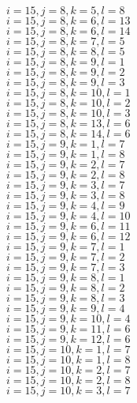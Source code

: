 \documentclass[14pt]{article}
\begin{document}
    $i=15,j=8,k=5,l=8 $ \\ 
    $i=15,j=8,k=6,l=13 $ \\ 
    $i=15,j=8,k=6,l=14 $ \\ 
    $i=15,j=8,k=7,l=5 $ \\ 
    $i=15,j=8,k=8,l=5 $ \\ 
    $i=15,j=8,k=9,l=1 $ \\ 
    $i=15,j=8,k=9,l=2 $ \\ 
    $i=15,j=8,k=9,l=3 $ \\ 
    $i=15,j=8,k=10,l=1 $ \\ 
    $i=15,j=8,k=10,l=2 $ \\ 
    $i=15,j=8,k=10,l=3 $ \\ 
    $i=15,j=8,k=13,l=6 $ \\ 
    $i=15,j=8,k=14,l=6 $ \\ 
    $i=15,j=9,k=1,l=7 $ \\ 
    $i=15,j=9,k=1,l=8 $ \\ 
    $i=15,j=9,k=2,l=7 $ \\ 
    $i=15,j=9,k=2,l=8 $ \\ 
    $i=15,j=9,k=3,l=7 $ \\ 
    $i=15,j=9,k=3,l=8 $ \\ 
    $i=15,j=9,k=4,l=9 $ \\ 
    $i=15,j=9,k=4,l=10 $ \\ 
    $i=15,j=9,k=6,l=11 $ \\ 
    $i=15,j=9,k=6,l=12 $ \\ 
    $i=15,j=9,k=7,l=1 $ \\ 
    $i=15,j=9,k=7,l=2 $ \\ 
    $i=15,j=9,k=7,l=3 $ \\ 
    $i=15,j=9,k=8,l=1 $ \\ 
    $i=15,j=9,k=8,l=2 $ \\ 
    $i=15,j=9,k=8,l=3 $ \\ 
    $i=15,j=9,k=9,l=4 $ \\ 
    $i=15,j=9,k=10,l=4 $ \\ 
    $i=15,j=9,k=11,l=6 $ \\ 
    $i=15,j=9,k=12,l=6 $ \\ 
    $i=15,j=10,k=1,l=7 $ \\ 
    $i=15,j=10,k=1,l=8 $ \\ 
    $i=15,j=10,k=2,l=7 $ \\ 
    $i=15,j=10,k=2,l=8 $ \\ 
    $i=15,j=10,k=3,l=7 $ \\ 
\end{document}
